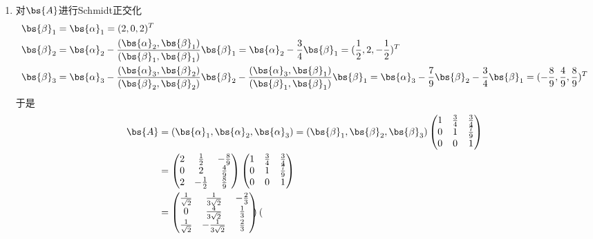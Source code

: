 \documentclass[12pt, a4paper, oneside, UTF8]{ctexbook}
\begin{document}
\begin{solution}
\begin{enumerate}[label=(\arabic*)]
        \item 对$\bs{A}$进行Schmidt正交化
        \begin{align*}
            \bs{\beta}_1&=\bs{\alpha}_1=(2,0,2)^T\\
            \bs{\beta}_2&=\bs{\alpha}_2-\frac{(\bs{\alpha}_2,\bs{\beta}_1)}{(\bs{\beta}_1,\bs{\beta}_1)}\bs{\beta}_1
            =\bs{\alpha}_2-\frac{3}{4}\bs{\beta}_1=
            (\frac{1}{2},2,-\frac{1}{2})^T\\
            \bs{\beta}_3&=\bs{\alpha}_3
            -\frac{(\bs{\alpha}_3,\bs{\beta}_2)}{(\bs{\beta}_2,\bs{\beta}_2)}\bs{\beta}_2
            -\frac{(\bs{\alpha}_3,\bs{\beta}_1)}{(\bs{\beta}_1,\bs{\beta}_1)}\bs{\beta}_1
            =\bs{\alpha}_3-\frac{7}{9}\bs{\beta}_2-\frac{3}{4}\bs{\beta}_1=
            (-\frac{8}{9},\frac{4}{9},\frac{8}{9})^T
        \end{align*}
        于是
        \begin{align*}
            \bs{A}
            &=(\bs{\alpha}_1,\bs{\alpha}_2,\bs{\alpha}_3)
            =(\bs{\beta}_1,\bs{\beta}_2,\bs{\beta}_3)
            \begin{pmatrix}
                1 &\frac{3}{4}&\frac{3}{4}\\
                0 & 1&\frac{7}{9} \\
                0&0&1
            \end{pmatrix}\\
            &=\begin{pmatrix}
                2& \frac{1}{2} & -\frac{8}{9}\\
                0& 2& \frac{4}{9} \\
                2 & -\frac{1}{2} & \frac{8}{9}
            \end{pmatrix} 
            \begin{pmatrix}
                1 &\frac{3}{4}&\frac{3}{4}\\
                0 & 1&\frac{7}{9} \\
                0&0&1
            \end{pmatrix}\\
            &=\begin{pmatrix}
                \frac{1}{\sqrt{2}}& \frac{1}{3\sqrt{2}} & -\frac{2}{3}\\
                0& \frac{4}{3\sqrt{2}}& \frac{1}{3} \\
                \frac{1}{\sqrt{2}} & -\frac{1}{3\sqrt{2}}& \frac{2}{3}
            \end{pmatrix}
            \begin{pmatrix}

\end{pmatrix}
\end{align*}
\end{enumerate}
\end{solution}
\end{document}
